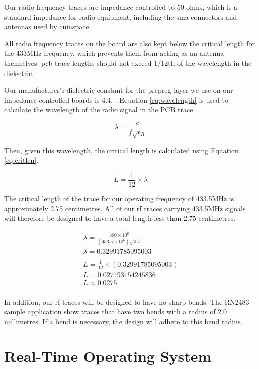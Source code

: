 Our radio frequency traces are impedance controlled to 50 ohms, which is a standard impedance for radio equipment,
including the \gls{sma} connectors and antennas used by \gls{cuinspace}.

All radio frequency traces on the board are also kept below the critical length for the 433MHz frequency, which
prevents them from acting as an antenna themselves. \Gls{pcb} trace lengths should not exceed 1/12th of the wavelength
in the dielectric. \cite{critical-length}

Our manufacturer's dielectric constant for the prepreg layer we use on our impedance controlled boards is 4.4.
\cite{jlc-pcb-impedance}. Equation \ref{eq:wavelength} is used to calculate the wavelength of the radio signal in the
PCB trace.

\begin{equation}
    \lambda = \frac{c}{f\sqrt{\epsilon_R}}
\end{equation} \label{eq:wavelength}

Then, given this wavelength, the critical length is calculated using Equation \ref{eq:critlen}.

\begin{equation}
    L = \frac{1}{12} \times \lambda
\end{equation} \label{eq:critlen}

The critical length of the trace for our operating frequency of 433.5MHz is approximately 2.75 centimetres. All of our
\gls{rf} traces carrying 433.5MHz signals will therefore be designed to have a total length less than 2.75 centimetres.

\begin{gather*}
    \lambda = \frac{300 \times 10^6}{(433.5 \times 10^6)\sqrt{4.4}} \\
    \lambda = 0.32991785095003 \\
    \\
    L = \frac{1}{12} \times (0.32991785095003) \\
    L = 0.027493154245836 \\
    L \approx 0.0275 \\
\end{gather*}

In addition, our \gls{rf} traces will be designed to have no sharp bends. The RN2483 sample application show traces
that have two bends with a radius of 2.0 millimetres. \cite[Sec. 5.1]{rn2483-datasheet} If a bend is necessary, the
design will adhere to this bend radius.

\section{Real-Time Operating System}

